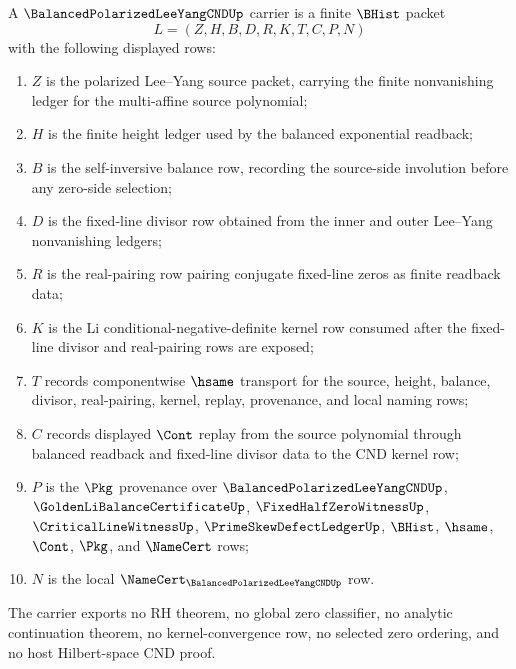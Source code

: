 \begin{definition}
\label{def:balanced-polarized-lee-yang-cnd-carrier}
A $\BalancedPolarizedLeeYangCNDUp$ carrier is a finite $\BHist$ packet
$$
L=(Z,H,B,D,R,K,T,C,P,N)
$$
with the following displayed rows:
\begin{enumerate}
\item $Z$ is the polarized Lee--Yang source packet, carrying the finite nonvanishing ledger for the multi-affine source polynomial;
\item $H$ is the finite height ledger used by the balanced exponential readback;
\item $B$ is the self-inversive balance row, recording the source-side involution before any zero-side selection;
\item $D$ is the fixed-line divisor row obtained from the inner and outer Lee--Yang nonvanishing ledgers;
\item $R$ is the real-pairing row pairing conjugate fixed-line zeros as finite readback data;
\item $K$ is the Li conditional-negative-definite kernel row consumed after the fixed-line divisor and real-pairing rows are exposed;
\item $T$ records componentwise $\hsame$ transport for the source, height, balance, divisor, real-pairing, kernel, replay, provenance, and local naming rows;
\item $C$ records displayed $\Cont$ replay from the source polynomial through balanced readback and fixed-line divisor data to the CND kernel row;
\item $P$ is the $\Pkg$ provenance over $\BalancedPolarizedLeeYangCNDUp$, $\GoldenLiBalanceCertificateUp$, $\FixedHalfZeroWitnessUp$, $\CriticalLineWitnessUp$, $\PrimeSkewDefectLedgerUp$, $\BHist$, $\hsame$, $\Cont$, $\Pkg$, and $\NameCert$ rows;
\item $N$ is the local $\NameCert_{\BalancedPolarizedLeeYangCNDUp}$ row.
\end{enumerate}
The carrier exports no RH theorem, no global zero classifier, no analytic continuation theorem, no kernel-convergence row, no selected zero ordering, and no host Hilbert-space CND proof.
\end{definition}

